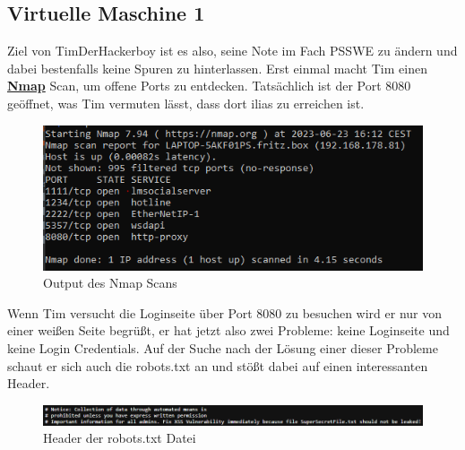 \documentclass[10pt, a4paper,onecolumn ,titlepage]{article}
\begin{document}
    \subsection{Virtuelle Maschine 1}
    \label{subsec:virtuelle-maschine-1}
    Ziel von TimDerHackerboy ist es also, seine Note im Fach PSSWE zu ändern und dabei bestenfalls keine Spuren zu hinterlassen.
    Erst einmal macht Tim einen \href{https://github.com/nmap/nmap}{\textbf{Nmap}} Scan, um offene Ports zu entdecken.
    Tatsächlich ist der Port 8080 geöffnet, was Tim vermuten lässt, dass dort \ac{ilias} zu erreichen ist.
    \begin{figure}[H]
        \centering
        \includegraphics[width=1\textwidth]{VM1_Bilder/NmapScan.PNG}
        \caption{Output des Nmap Scans}
        \label{fig:NmapScan}
    \end{figure}
    \noindent
    Wenn Tim versucht die Loginseite über Port 8080 zu besuchen wird er nur von einer weißen Seite begrüßt,
    er hat jetzt also zwei Probleme: keine Loginseite und keine Login Credentials.
    Auf der Suche nach der Lösung einer dieser Probleme schaut er sich auch die robots.txt an und stößt dabei auf einen interessanten Header.

    \begin{figure}[H]
        \centering
        \includegraphics[width=1\textwidth]{VM1_Bilder/robotstxt.PNG}
        \caption{Header der robots.txt Datei }
        \label{fig:robotsTxt}
    \end{figure}
\end{document}
